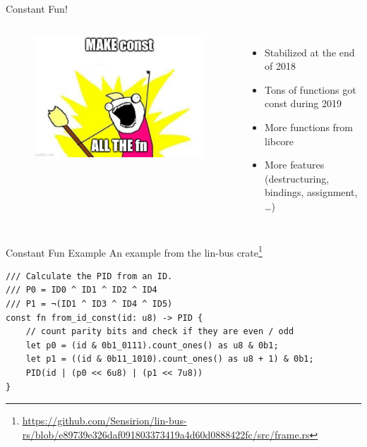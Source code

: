 \documentclass[aspectratio=1610,14pt,t]{beamer}
\begin{document}
\begin{frame}{Constant Fun!}
  \begin{columns}[t,onlytextwidth]
    \begin{figure}
    \includegraphics[width=\textwidth]{img/const-all-the-fn.jpg}
    \end{figure}
    \begin{itemize}
      \item Stabilized at the end of 2018
      \item Tons of functions got const during 2019
      \item More functions from libcore
      \item More features (destructuring, bindings, assignment, \ldots)
    \end{itemize}
  \end{columns}
\end{frame}

\begin{frame}[c,fragile]{Constant Fun Example}
An example from the lin-bus crate\footnote{\url{https://github.com/Sensirion/lin-bus-rs/blob/e89739e326daf091803373419a4d60d0888422fc/src/frame.rs}}
  \begin{verbatim}
/// Calculate the PID from an ID.
/// P0 = ID0 ^ ID1 ^ ID2 ^ ID4
/// P1 = ¬(ID1 ^ ID3 ^ ID4 ^ ID5)
const fn from_id_const(id: u8) -> PID {
    // count parity bits and check if they are even / odd
    let p0 = (id & 0b1_0111).count_ones() as u8 & 0b1;
    let p1 = ((id & 0b11_1010).count_ones() as u8 + 1) & 0b1;
    PID(id | (p0 << 6u8) | (p1 << 7u8))
}
  \end{verbatim}
\end{frame}
\end{document}
